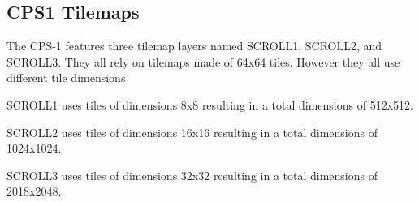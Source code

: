 












\subsection{CPS1 Tilemaps}
The CPS-1 features three tilemap layers named SCROLL1, SCROLL2, and SCROLL3. They all rely on tilemaps made of 64x64 tiles. However they all use different tile dimensions. 

SCROLL1 uses tiles of dimensions 8x8 resulting in a total dimensions of 512x512.

SCROLL2 uses tiles of dimensions 16x16 resulting in a total dimensions of 1024x1024.

SCROLL3 uses tiles of dimensions 32x32 resulting in a total dimensions of 2018x2048.


